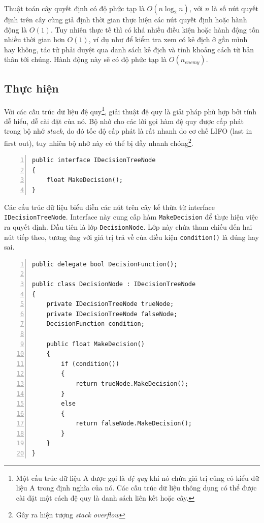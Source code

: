 \documentclass[12pt]{report}
\begin{document}
Thuật toán cây quyết định có độ phức tạp là $O(n \log _2 n)$, với $n$ là số nút quyết định trên cây cùng giả định thời gian thực hiện các nút quyết định hoặc hành động là $O(1)$. Tuy nhiên thực tế thì có khá nhiều điều kiện hoặc hành động tốn nhiều thời gian hơn $O(1)$, ví dụ như để kiểm tra xem có kẻ địch ở gần mình hay không, tác tử phải duyệt qua danh sách kẻ địch và tính khoảng cách từ bản thân tới chúng. Hành động này sẽ có độ phức tạp là $O(n_{enemy})$.

\subsection{Thực hiện}
Với các cấu trúc dữ liệu đệ quy\footnote{Một cấu trúc dữ liệu A được gọi là \textit{đệ quy} khi nó chứa giá trị cũng có kiểu dữ liệu A trong định nghĩa của nó. Các cấu trúc dữ liệu thông dụng có thể được cài đặt một cách đệ quy là danh sách liên kết hoặc cây.}, giải thuật đệ quy là giải pháp phù hợp bởi tính dễ hiểu, dễ cài đặt của nó. Bộ nhớ cho các lời gọi hàm đệ quy được cấp phát trong bộ nhớ \textit{stack}, do đó tốc độ cấp phát là rất nhanh do cơ chế LIFO (last in first out), tuy nhiên bộ nhớ này có thể bị đầy nhanh chóng\footnote{Gây ra hiện tượng \textit{stack overflow}}.

\begin{lstlisting}[frame=lines, basicstyle=\footnotesize\ttfamily, numbers=left, numberstyle=\tiny\color{black},caption= {Interface \texttt{IDecisionTreeNode}}, backgroundcolor=\color{background}]
public interface IDecisionTreeNode
{
	float MakeDecision();
}
\end{lstlisting}

Các cấu trúc dữ liệu biểu diễn các nút trên cây kế thừa từ interface \texttt{IDecisionTreeNode}. Interface này cung cấp hàm \texttt{MakeDecision} để thực hiện việc ra quyết định. Đầu tiên là lớp \texttt{DecisionNode}. Lớp này chứa tham chiếu đến hai nút tiếp theo, tương ứng với giá trị trả về của điều kiện \texttt{condition()} là đúng hay sai.

\begin{lstlisting}[frame=lines, basicstyle=\footnotesize\ttfamily, numbers=left, numberstyle=\tiny\color{black},caption= {Lớp \texttt{DecisionNode}}, backgroundcolor=\color{background}]
public delegate bool DecisionFunction();

public class DecisionNode : IDecisionTreeNode
{
	private IDecisionTreeNode trueNode;
	private IDecisionTreeNode falseNode;
	DecisionFunction condition;

	public float MakeDecision()
	{
		if (condition())
		{
			return trueNode.MakeDecision();
		}
		else
		{
			return falseNode.MakeDecision();
		}
	}
}
\end{lstlisting}
\end{document}
